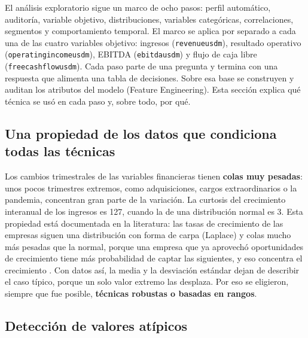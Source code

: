 \documentclass[12pt,letterpaper,oneside]{report}
\renewcommand{\_}{\UnderscoreOriginal\allowbreak}
\begin{document}
El análisis exploratorio sigue un marco de ocho pasos: perfil automático, auditoría, variable objetivo, distribuciones, variables categóricas, correlaciones, segmentos y comportamiento temporal. El marco se aplica por separado a cada una de las cuatro variables objetivo: ingresos (\texttt{revenue\_usd\_m}), resultado operativo (\texttt{operating\_income\_usd\_m}), EBITDA (\texttt{ebitda\_usd\_m}) y flujo de caja libre (\texttt{free\_cash\_flow\_usd\_m}). Cada paso parte de una pregunta y termina con una respuesta que alimenta una tabla de decisiones. Sobre esa base se construyen y auditan los atributos del modelo (Feature Engineering). Esta sección explica qué técnica se usó en cada paso y, sobre todo, por qué.

\subsection{Una propiedad de los datos que condiciona todas las técnicas}

Los cambios trimestrales de las variables financieras tienen \textbf{colas muy pesadas}: unos pocos trimestres extremos, como adquisiciones, cargos extraordinarios o la pandemia, concentran gran parte de la variación. La curtosis del crecimiento interanual de los ingresos es 127, cuando la de una distribución normal es 3. Esta propiedad está documentada en la literatura: las tasas de crecimiento de las empresas siguen una distribución con forma de carpa (Laplace) y colas mucho más pesadas que la normal, porque una empresa que ya aprovechó oportunidades de crecimiento tiene más probabilidad de captar las siguientes, y eso concentra el crecimiento \parencite{bottazzi2006explaining}. Con datos así, la media y la desviación estándar dejan de describir el caso típico, porque un solo valor extremo las desplaza. Por eso se eligieron, siempre que fue posible, \textbf{técnicas robustas o basadas en rangos}.

\subsection{Detección de valores atípicos}
\end{document}
